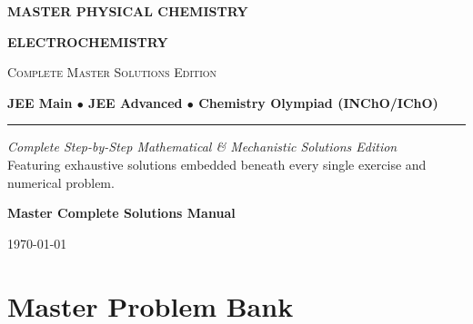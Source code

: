 \documentclass[11pt,a4paper,oneside]{report}
\begin{document}
\begin{titlepage}
    \centering
    \vspace*{2cm}
    {\Huge\bfseries\color{primarynavy} MASTER PHYSICAL CHEMISTRY\par}
    \vspace{0.8cm}
    {\Huge\bfseries\color{cengagegreen} ELECTROCHEMISTRY\par}
    \vspace{0.5cm}
    {\large\scshape Complete Master Solutions Edition\par}
    \vspace{0.3cm}
    {\normalsize\color{accentamber}\textbf{JEE Main $\bullet$ JEE Advanced $\bullet$ Chemistry Olympiad (INChO/IChO)}\par}
    
    \vspace{2cm}
    \rule{0.8\textwidth}{1.5pt}
    \vspace{1.5cm}
    
    \begin{minipage}{0.8\textwidth}
        \small\centering
        \textit{Complete Step-by-Step Mathematical \& Mechanistic Solutions Edition}\\
        Featuring exhaustive solutions embedded beneath every single exercise and numerical problem.
    \end{minipage}
    
    \vfill
    {\large\bfseries Master Complete Solutions Manual\par}
    \vspace{0.5cm}
    {\small \today\par}
\end{titlepage}

\tableofcontents
\newpage






















\part*{Master Problem Bank}









\end{document}
